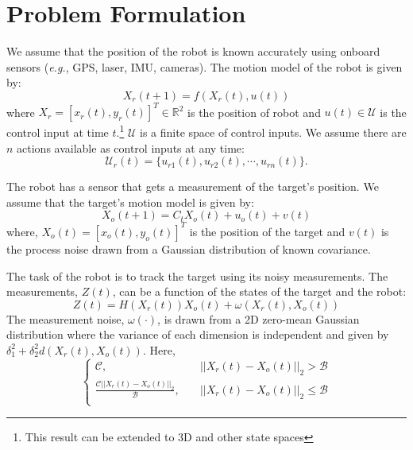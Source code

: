 \documentclass[journal]{IEEEtran}
\begin{document}
\section{Problem Formulation} \label{sec:probform}
We assume that the position of the robot is known accurately using onboard sensors (\emph{e.g.}, GPS, laser, IMU, cameras). The motion model of the robot is given by:
\begin{equation}
  \label{eq1}
  X_r(t+1)=f(X_r(t),u(t))
\end{equation}
where $X_r=[x_r(t), y_r(t)]^T\in\mathbb{R}^2$ is the position of robot and $u(t)\in \mathcal{U} $ is the control input at time $t$.\footnote{This result can be extended to 3D and other state spaces } $\mathcal{U} $ is a finite space of control inputs. We assume there are $n$ actions available as control inputs at any time:
$$\mathcal{U}_r(t)=\{u_{r1}(t),u_{r2}(t),\cdots, u_{rn}(t)\}.$$

The robot has a sensor that gets a measurement of the target's position. We assume that the target's motion model is given by:
\begin{equation}
  \label{eq2}
  X_o(t+1)=C_tX_o(t)+u_o(t)+v(t)
\end{equation}   
where, $ X_o(t)=[ x_o(t),  y_o(t)]^T   $ is the position of the target and $v(t)$ is the process noise drawn from a Gaussian distribution of known covariance.

The task of the robot is to track the target using its noisy measurements. The measurements, $Z(t)$, can be a function of the states of the target and the robot:
\begin{equation}
  \label{eq3}
  Z(t)= H(X_r(t)) X_o(t)  +\omega(X_r(t), X_o(t))
\end{equation}
The measurement noise, $\omega(\cdot)$, is drawn from a 2D zero-mean Gaussian distribution where the variance of each dimension is independent and given by $\delta_1^2 +\delta_2^2d(X_r(t),X_o(t))$. Here,
\begin{equation}
\left\{
\begin{aligned}
\mathcal{C},\qquad \qquad &\quad ||X_r(t)-X_o(t)||_2>\mathcal{B} \\ 
    \frac{\mathcal{C}||X_r(t)-X_o(t)||_2}{\mathcal{B}} , &\quad ||X_r(t)-X_o(t)||_2 \le \mathcal{B} \\  
\end{aligned}
\right.
\label{eqn:cov}
\end{equation}
\end{document}
